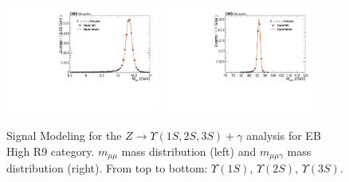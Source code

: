 \begin{figure}[!htbp]
\begin{center}
\includegraphics[width=0.45\textwidth]{figures_and_tables/fitPlotFiles2D/ZToUpsilonPhotonSignalAndBackgroundFit/mMuMNU_ZToUpsilon3SPhotonSignalAndBackgroundFit_Signal_Cat1}\hspace*{1.cm}
\includegraphics[width=0.45\textwidth]{figures_and_tables/fitPlotFiles2D/ZToUpsilonPhotonSignalAndBackgroundFit/mHZ_ZToUpsilon3SPhotonSignalAndBackgroundFit_Signal_Cat1_default}\hspace*{1.cm}


\end{center}\vspace*{-.5cm}
\caption{Signal Modeling for the $Z \rightarrow \Upsilon(1S,2S,3S) +\gamma$ analysis for EB High R9 category. $m_{\mu\mu}$ mass distribution (left) and $m_{\mu\mu\gamma}$ mass distribution (right). From top to bottom: $\Upsilon(1S)$, $\Upsilon(2S)$, $\Upsilon(3S)$.}
\label{fig:ZToUpsilon_Signal_Cat1}
\end{figure}

